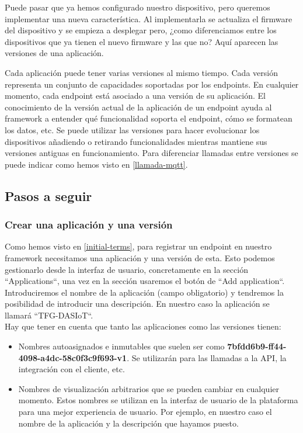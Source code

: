 {Puede pasar que ya hemos configurado nuestro dispositivo, pero queremos implementar una nueva característica. Al implementarla se actualiza el firmware del dispositivo y se empieza a desplegar pero, ¿como diferenciamos entre los dispositivos que ya tienen el nuevo firmware y las que no? Aquí aparecen las versiones de una aplicación.

Cada aplicación puede tener varias versiones al mismo tiempo. Cada versión representa un conjunto de capacidades soportadas por los endpoints. En cualquier momento, cada endpoint está asociado a una versión de su aplicación. El conocimiento de la versión actual de la aplicación de un endpoint ayuda al framework a entender qué funcionalidad soporta el endpoint, cómo se formatean los datos, etc. Se puede utilizar las versiones para hacer evolucionar los dispositivos añadiendo o retirando funcionalidades mientras mantiene sus versiones antiguas en funcionamiento. Para diferenciar llamadas entre versiones se puede indicar como hemos visto en \ref{llamada-mqtt}.

\subsection{Pasos a seguir}

\subsubsection{Crear una aplicación y una versión}

Como hemos visto en \ref{initial-terms}, para registrar un endpoint en nuestro framework necesitamos una aplicación y una versión de esta. Esto podemos gestionarlo desde la interfaz de usuario, concretamente en la sección ``Applications``, una vez en la sección usaremos el botón de ``Add application``. Introduciremos el nombre de la aplicación (campo obligatorio) y tendremos la posibilidad de introducir una descripción. En nuestro caso la aplicación se llamará ``TFG-DASIoT``. \\

Hay que tener en cuenta que tanto las aplicaciones como las versiones tienen:

\begin{itemize}
    \item Nombres autoasignados e inmutables que suelen ser como  \textbf{7bfdd6b9-ff44-4098-a4dc-58c0f3c9f693-v1}. Se utilizarán para las llamadas a la API, la integración con el cliente, etc.
    \item Nombres de visualización arbitrarios que se pueden cambiar en cualquier momento. Estos nombres se utilizan en la interfaz de usuario de la plataforma para una mejor experiencia de usuario. Por ejemplo, en nuestro caso el nombre de la aplicación y la descripción que hayamos puesto.
\end{itemize}

}

